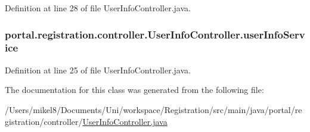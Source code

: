 Definition at line 28 of file UserInfoController.java.

\hypertarget{classportal_1_1registration_1_1controller_1_1UserInfoController_ac06a557486646e8c2fd7a75ad935b6d3}{
\subsubsection[{userInfoService}]{ {\bf portal.registration.controller.UserInfoController.userInfoService}}}
\label{classportal_1_1registration_1_1controller_1_1UserInfoController_ac06a557486646e8c2fd7a75ad935b6d3}


Definition at line 25 of file UserInfoController.java.



The documentation for this class was generated from the following file:\begin{DoxyCompactItemize}
\item 
/Users/mikel8/Documents/Uni/workspace/Registration/src/main/java/portal/registration/controller/\hyperlink{UserInfoController_8java}{UserInfoController.java}\end{DoxyCompactItemize}
